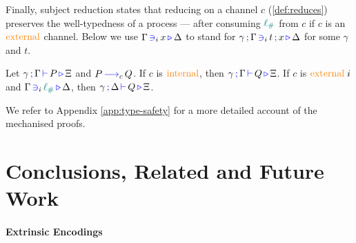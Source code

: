 \documentclass[runningheads]{llncs}
\newcommand{\type}[1]{\textcolor{blue}{\operatorname{#1}}}
\newcommand{\constr}[1]{\textcolor{orange}{\operatorname{#1}}}
\newcommand{\func}[1]{\textcolor{teal}{\operatorname{#1}}}
\newcommand{\lio}{\func{\ell_{\#}}}
\newcommand{\reduce}[1]{\, \type{\longrightarrow}_{#1} \,}
\newcommand{\types}[4]{#1 \, \type{;} \, #2 \, \type{\vdash} \, #3 \, \type{\triangleright} \, #4}
\newcommand{\contains}[6]{#1 \, \type{;} \, #2 \, \type{\ni}_{#3} \, #4 \, \type{;} \, #5 \, \type{\triangleright} \, #6}
\newcommand{\containsusage}[4]{#1 \, \type{\ni}_{#2} \, #3 \, \type{\triangleright} \, #4}
\begin{document}
Finally, subject reduction states that reducing on a channel $c$ (\autoref{def:reduces}) preserves the well-typedness of a process --- after consuming $\lio$ from $c$ if $c$ is an $\constr{external}$ channel.  Below we use $\containsusage{\Gamma}{i}{x}{\Delta}$ to stand for $\contains{\gamma}{\Gamma}{i}{t}{x}{\Delta}$ for some $\gamma$ and $t$.
\begin{nitheorem}
  \label{thm:subject-reduction}
  Let $\types{\gamma}{\Gamma}{P}{\Xi}$ and $P \reduce{c} Q$.
  If $c$ is $\constr{internal}$, then $\types{\gamma}{\Gamma}{Q}{\Xi}$.
  If $c$ is $\constr{external} \; i$ and $\containsusage{\Gamma}{i}{\lio}{\Delta}$, then $\types{\gamma}{\Delta}{Q}{\Xi}$.
\end{nitheorem}
We refer to Appendix \ref{app:type-safety} for a more detailed account of the mechanised proofs.

\section{Conclusions, Related and Future Work}

\paragraph*{Extrinsic Encodings}
\end{document}
